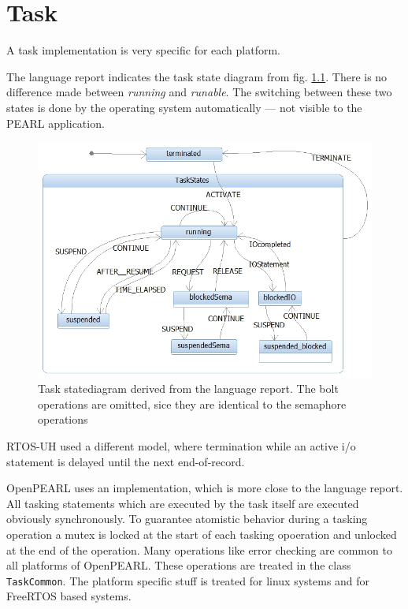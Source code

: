\chapter{Task}
\label{task}
A task implementation is very specific for each platform.

The language report indicates the task state diagram from 
fig. \ref{taskStatesPEARL90}. There is no difference made between {\em running} and {\em runable}. The switching between these two states is done by the
operating system automatically --- not visible to the PEARL application.

\begin{figure}[bpht]
\includegraphics[width=14cm]{taskStatesPEARL.jpg}
\caption{Task statediagram derived from the language report.
The bolt operations are omitted, sice they are identical to the
semaphore operations}
\label{taskStatesPEARL90}
\end{figure}


RTOS-UH used a different model, where termination while an active i/o statement
is delayed until the next end-of-record. 
 

OpenPEARL uses an implementation, which is more close to the language report.
All tasking statements which are executed by the task itself are executed 
obviously synchronously. To guarantee atomistic behavior during a 
tasking operation a mutex is locked at the start of each tasking opoeration and 
unlocked at the end of the operation.
Many operations like error checking are common to all platforms of OpenPEARL.
These operations are treated in the class \texttt{TaskCommon}. The platform specific 
stuff is treated for linux systems and for FreeRTOS based systems.

